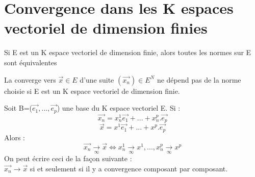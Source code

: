 \section{Convergence dans les K espaces vectoriel de dimension finies}
\begin{theo}
Si E est un K espace vectoriel de dimension finie, alors toutes les normes sur E sont équivalentes
\end{theo}
\begin{corro}
La converge vers $\overrightarrow{x}\in E$ d'une suite $(\overrightarrow{x_n}) \in E^N$ ne dépend pas de la norme choisie si E est un K espace vectoriel de dimension finie.
\end{corro}
\begin{prop}
Soit B=($\overrightarrow{e_1},...,\overrightarrow{e_p}$) une base du K espace vectoriel E. Si :
$$\overrightarrow{x_n} = x_n^1\overrightarrow{e_1} + ...+x_n^p.\overrightarrow{e_p}$$
$$\overrightarrow{x} = x^1\overrightarrow{e_1} + ...+x^p.\overrightarrow{e_p}$$
Alors : 
$$\overrightarrow{x_n} \underset{\infty}\rightarrow \overrightarrow{x} \Leftrightarrow x_n^1\underset{\infty}\rightarrow x^1,...,x_n^p\underset{\infty}\rightarrow x^p$$
On peut écrire ceci de la façon suivante : \\
$\overrightarrow{x_n} \rightarrow \overrightarrow{x}$ si et seulement si il y a convergence composant par composant.
\end{prop}

